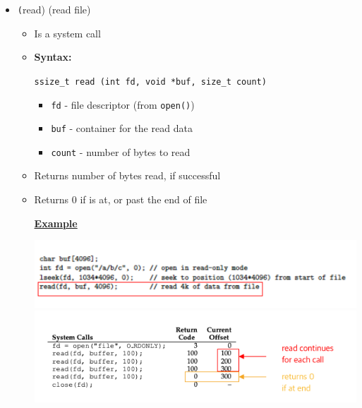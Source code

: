 \documentclass[12pt]{article}
\begin{document}
\begin{enumerate}[1.]
\begin{enumerate}[a)]
\begin{itemize}
\begin{itemize}
                \item \texttt(read) (read file)
                \begin{itemize}
                    \item Is a system call
                    \item \textbf{Syntax:}

                    \bigskip

                    \texttt{ssize\_t read (int fd, void *buf, size\_t count)}

                    \bigskip

                    \begin{itemize}
                        \item \texttt{fd} - file descriptor (from \texttt{open()})
                        \item \texttt{buf} - container for the read data
                        \item \texttt{count} - number of bytes to read
                    \end{itemize}
                    \item Returns number of bytes read, if successful
                    \item Returns 0 if is at, or past the end of file

                    \bigskip

                    \underline{\textbf{Example}}

                    \bigskip

                    \begin{center}
                    \includegraphics[width=\linewidth]{../images/midterm_4_solution_3.png}
                    \includegraphics[width=\linewidth]{../images/midterm_4_solution_5.png}
                    \end{center}


\end{itemize}
\end{itemize}
\end{itemize}
\end{enumerate}
\end{enumerate}
\end{document}
